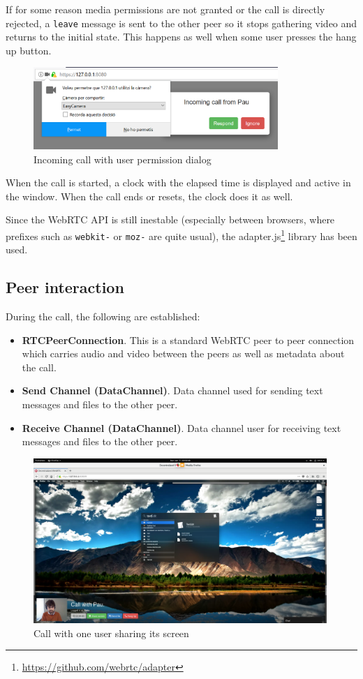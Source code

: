 \documentclass[paper=a4, fontsize=11pt]{scrartcl} %
\numberwithin{equation}{section} %
\numberwithin{figure}{section} %
\numberwithin{table}{section} %
\begin{document}
If for some reason media permissions are not granted or the call is directly rejected, a \verb|leave| message is sent to the other peer so it stops gathering video and returns to the initial state. This happens as well when some user presses the hang up button.

\begin{figure}[ht!]
	\centering
	\includegraphics[width=350px]{incoming-call.png}
	\caption{Incoming call with user permission dialog}
\end{figure}

When the call is started, a clock with the elapsed time is displayed and active in the window. When the call ends or resets, the clock does it as well.

Since the WebRTC API is still inestable (especially between browsers, where prefixes such as \verb|webkit-| or \verb|moz-| are quite usual), the adapter.js\footnote{\url{https://github.com/webrtc/adapter}} library has been used.

\subsection{Peer interaction}

During the call, the following are established:

\begin{itemize}
	\item \textbf{RTCPeerConnection}. This is a standard WebRTC peer to peer connection which carries audio and video between the peers as well as metadata about the call.
	\item \textbf{Send Channel (DataChannel)}. Data channel used for sending text messages and files to the other peer.
	\item \textbf{Receive Channel (DataChannel)}. Data channel user for receiving text messages and files to the other peer.
\end{itemize}

\begin{figure}[ht!]
	\centering
	\includegraphics[width=420px]{screen-sharing.png}
	\caption{Call with one user sharing its screen}
\end{figure}
\end{document}
